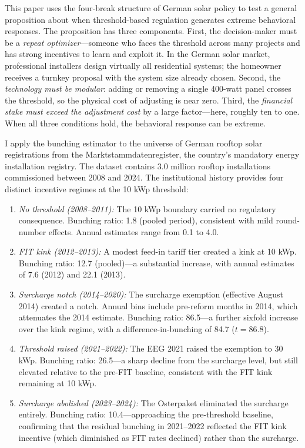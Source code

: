\documentclass[12pt]{article}
\begin{document}
This paper uses the four-break structure of German solar policy to test a general proposition about when threshold-based regulation generates extreme behavioral responses. The proposition has three components. First, the decision-maker must be a \textit{repeat optimizer}---someone who faces the threshold across many projects and has strong incentives to learn and exploit it. In the German solar market, professional installers design virtually all residential systems; the homeowner receives a turnkey proposal with the system size already chosen. Second, the \textit{technology must be modular}: adding or removing a single 400-watt panel crosses the threshold, so the physical cost of adjusting is near zero. Third, the \textit{financial stake must exceed the adjustment cost} by a large factor---here, roughly ten to one. When all three conditions hold, the behavioral response can be extreme.

I apply the \citet{kleven2013using} bunching estimator to the universe of German rooftop solar registrations from the Marktstammdatenregister, the country's mandatory energy installation registry. The dataset contains 3.0 million rooftop installations commissioned between 2008 and 2024. The institutional history provides four distinct incentive regimes at the 10 kWp threshold:

\begin{enumerate}
  \item \textit{No threshold (2008--2011):} The 10 kWp boundary carried no regulatory consequence. Bunching ratio: 1.8 (pooled period), consistent with mild round-number effects. Annual estimates range from 0.1 to 4.0.
  \item \textit{FIT kink (2012--2013):} A modest feed-in tariff tier created a kink at 10 kWp. Bunching ratio: 12.7 (pooled)---a substantial increase, with annual estimates of 7.6 (2012) and 22.1 (2013).
  \item \textit{Surcharge notch (2014--2020):} The surcharge exemption (effective August 2014) created a notch. Annual bins include pre-reform months in 2014, which attenuates the 2014 estimate. Bunching ratio: 86.5---a further sixfold increase over the kink regime, with a difference-in-bunching of 84.7 ($t = 86.8$).
  \item \textit{Threshold raised (2021--2022):} The EEG 2021 raised the exemption to 30 kWp. Bunching ratio: 26.5---a sharp decline from the surcharge level, but still elevated relative to the pre-FIT baseline, consistent with the FIT kink remaining at 10 kWp.
  \item \textit{Surcharge abolished (2023--2024):} The Osterpaket eliminated the surcharge entirely. Bunching ratio: 10.4---approaching the pre-threshold baseline, confirming that the residual bunching in 2021--2022 reflected the FIT kink incentive (which diminished as FIT rates declined) rather than the surcharge.
\end{enumerate}
\end{document}
